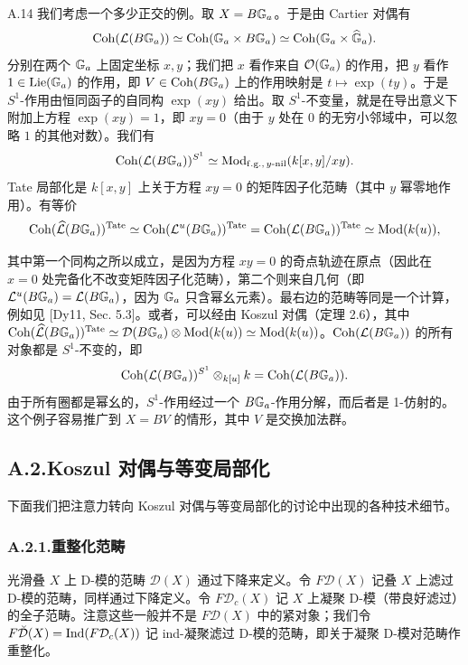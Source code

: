 \begin{exam}{A.14}\label{exam:a5-04-8}
我们考虑一个多少正交的例。取 $X=B\mathbb{G}_a$。于是由 Cartier 对偶有
\[
\operatorname{Coh}(\mathcal L(B\mathbb{G}_a))\simeq\operatorname{Coh}(\mathbb{G}_a\times B\mathbb{G}_a)\simeq\operatorname{Coh}(\mathbb{G}_a\times\widehat{\mathbb{G}}_a).
\]
分别在两个 $\mathbb{G}_a$ 上固定坐标 $x,y$；我们把 $x$ 看作来自 $\mathcal{O}(\mathbb{G}_a)$ 的作用，把 $y$ 看作 $1\in\mathrm{Lie}(\mathbb{G}_a)$ 的作用，即 $V\in\operatorname{Coh}(B\mathbb{G}_a)$ 上的作用映射是 $t\mapsto\exp(ty)$。于是 $S^1$-作用由恒同函子的自同构 $\exp(xy)$ 给出。取 $S^1$-不变量，就是在导出意义下附加上方程 $\exp(xy)=1$，即 $xy=0$（由于 $y$ 处在 $0$ 的无穷小邻域中，可以忽略 $1$ 的其他对数）。我们有
\[
\operatorname{Coh}(\mathcal L(B\mathbb{G}_a))^{S^1}\simeq\operatorname{Mod}_{\mathrm{f.g.},\,y\text{-}\mathrm{nil}}(k[x,y]/xy).
\]
Tate 局部化是 $k[x,y]$ 上关于方程 $xy=0$ 的矩阵因子化范畴（其中 $y$ 幂零地作用）。有等价
\[
\operatorname{Coh}(\widehat{\mathcal L}(B\mathbb{G}_a))^{\mathrm{Tate}}
\simeq\operatorname{Coh}(\mathcal L^u(B\mathbb{G}_a))^{\mathrm{Tate}}
=\operatorname{Coh}(\mathcal L(B\mathbb{G}_a))^{\mathrm{Tate}}
\simeq\operatorname{Mod}(k(u)),
\]


其中第一个同构之所以成立，是因为方程 $xy=0$ 的奇点轨迹在原点（因此在 $x=0$ 处完备化不改变矩阵因子化范畴），第二个则来自几何（即 $\mathcal L^u(B\mathbb{G}_a)=\mathcal L(B\mathbb{G}_a)$，因为 $\mathbb{G}_a$ 只含幂幺元素）。最右边的范畴等同是一个计算，例如见 [Dy11, Sec. 5.3]。或者，可以经由 Koszul 对偶（定理 2.6），其中 $\operatorname{Coh}(\widehat{\mathcal L}(B\mathbb{G}_a))^{\mathrm{Tate}}\simeq\mathcal D(B\mathbb{G}_a)\otimes\operatorname{Mod}(k(u))\simeq\operatorname{Mod}(k(u))$。$\operatorname{Coh}(\mathcal L(B\mathbb{G}_a))$ 的所有对象都是 $S^1$-不变的，即
\[
\operatorname{Coh}(\mathcal L(B\mathbb{G}_a))^{S^1}\otimes_{k[u]}k=\operatorname{Coh}(\mathcal L(B\mathbb{G}_a)).
\]
由于所有圈都是幂幺的，$S^1$-作用经过一个 $B\mathbb{G}_a$-作用分解，而后者是 1-仿射的。这个例子容易推广到 $X=BV$ 的情形，其中 $V$ 是交换加法群。
\end{exam}

\subsection*{A.2.\quad Koszul 对偶与等变局部化}

下面我们把注意力转向 Koszul 对偶与等变局部化的讨论中出现的各种技术细节。

\subsubsection*{A.2.1.\quad 重整化范畴}

光滑叠 $X$ 上 D-模的范畴 $\mathcal D(X)$ 通过下降来定义。令 $F\mathcal D(X)$ 记叠 $X$ 上滤过 D-模的范畴，同样通过下降定义。令 $F\mathcal D_c(X)$ 记 $X$ 上凝聚 D-模（带良好滤过）的全子范畴。注意这些一般并不是 $F\mathcal D(X)$ 中的紧对象；我们令 $F\breve{\mathcal D}(X)=\operatorname{Ind}(F\mathcal D_c(X))$ 记 ind-凝聚滤过 D-模的范畴，即关于凝聚 D-模对范畴作重整化。

